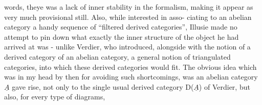 words, theye was a lack of inner stability in the formalism, making it
appear as very much provisional still. Also, while interested in asso-%
ciating to an abelian category a handy sequence of ``filtered derived
categories'', Illusie made no attempt to pin down what exactly the
inner structure of the object he had arrived at was - unlike Verdier,
who  introduced, alongside with the notion of a derived category of an
abelian category, a general notion of triangulated categories, into
which these derived categories would fit. The obvious idea which was in
my head by then for avoiding such shortcomings, was  an
abelian category $\underline{A}$ gave rise, not only to the  single usual
derived category D($\underline{A}$) of Verdier, but also, for every type of diagrams,

